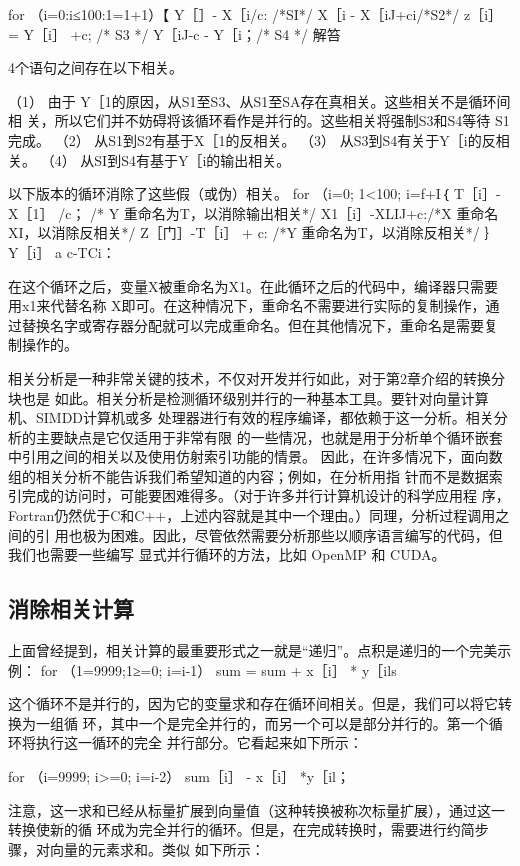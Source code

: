 for （i=0:i≤100:1=1+1）【
Y［］- X［i/c: /*SI*/
X［i - X［iJ+ci/*S2*/
z［i］ = Y［i］ +c; /* S3 */
Y［iJ-c - Y［i；/* S4 */
解笞

4个语句之间存在以下相关。

（1） 由于 Y［1的原因，从S1至S3、从S1至SA存在真相关。这些相关不是循环间相
关，所以它们并不妨碍将该循环看作是并行的。这些相关将强制S3和S4等待
S1完成。
（2） 从S1到S2有基于X［1的反相关。
（3） 从S3到S4有关于Y［i的反相关。
（4） 从SI到S4有基于Y［i的输出相关。

以下版本的循环消除了这些假（或伪）相关。
for （i=0; 1<100; i=f+I｛
T［i］- X［1］ /c； /* Y 重命名为T，以消除输出相关*/
X1［i］-XLIJ+c:/*X 重命名 XI，以消除反相关*/
Z［门］-T［i］ + c: /*Y 重命名为T，以消除反相关*/
｝
Y［i］ a c-TCi：

在这个循环之后，变量X被重命名为X1。在此循环之后的代码中，编译器只需要
用x1来代替名称 X即可。在这种情况下，重命名不需要进行实际的复制操作，通
过替换名字或寄存器分配就可以完成重命名。但在其他情况下，重命名是需要复
制操作的。

相关分析是一种非常关键的技术，不仅对开发并行如此，对于第2章介绍的转换分块也是
如此。相关分析是检测循环级别并行的一种基本工具。要针对向量计算机、SIMDD计算机或多
处理器进行有效的程序编译，都依赖于这一分析。相关分析的主要缺点是它仅适用于非常有限
的一些情况，也就是用于分析单个循环嵌套中引用之间的相关以及使用仿射索引功能的情景。
因此，在许多情况下，面向数组的相关分析不能告诉我们希望知道的内容；例如，在分析用指
针而不是数据索引完成的访问时，可能要困难得多。（对于许多并行计算机设计的科学应用程
序，Fortran仍然优于C和C++，上述内容就是其中一个理由。）同理，分析过程调用之间的引
用也极为困难。因此，尽管依然需要分析那些以顺序语言编写的代码，但我们也需要一些编写
显式并行循环的方法，比如 OpenMP 和 CUDA。

\subsection{消除相关计算}
上面曾经提到，相关计算的最重要形式之一就是“递归”。点积是递归的一个完美示例：
for （1=9999;1≥=0; i=i-1）
sum = sum + x［i］ * y［ils

这个循环不是并行的，因为它的变量求和存在循环间相关。但是，我们可以将它转换为一组循
环，其中一个是完全并行的，而另一个可以是部分并行的。第一个循环将执行这一循环的完全
并行部分。它看起来如下所示：

for （i=9999; i>=0; i=i-2）
sum［i］ - x［i］ *y［il；

注意，这一求和已经从标量扩展到向量值（这种转换被称次标量扩展），通过这一转换使新的循
环成为完全并行的循环。但是，在完成转换时，需要进行约简步骤，对向量的元素求和。类似
如下所示：

